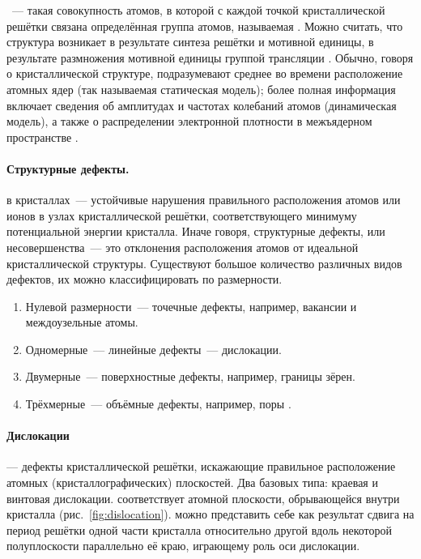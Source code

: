 \documentclass[a4paper, 14pt, titlepage]{extarticle}
\begin{document}
  ~--- такая совокупность атомов, в которой с каждой точкой
  кристаллической решётки связана определённая группа атомов, называемая . Можно считать,
  что структура возникает в результате синтеза решётки и мотивной единицы, в результате размножения
  мотивной единицы группой трансляции \cite{wiki-cryst-struct}.
  Обычно, говоря о кристаллической структуре, подразумевают среднее во времени расположение атомных
  ядер (так называемая статическая модель); более полная информация включает сведения об амплитудах и частотах
  колебаний атомов (динамическая модель), а также о распределении электронной плотности в межъядерном
  пространстве \cite{chemenc-crystall}.

  \paragraph{Структурные дефекты.}  в кристаллах~--- устойчивые нарушения правильного
  расположения атомов или ионов в узлах кристаллической решётки, соответствующего минимуму потенциальной
  энергии кристалла. Иначе говоря, структурные дефекты, или несовершенства~--- это отклонения
  расположения атомов от идеальной кристаллической структуры. Существуют большое количество
  различных видов дефектов, их можно классифицировать по размерности.
  \begin{enumerate}
    \item Нулевой размерности~--- точечные дефекты, например, вакансии и междоузельные атомы.
    \item Одномерные~--- линейные дефекты~--- дислокации.
    \item Двумерные~--- поверхностные дефекты, например, границы зёрен.
    \item Трёхмерные~--- объёмные дефекты, например, поры \cite{matare-defects}.
  \end{enumerate}

  \paragraph{Дислокации}--- дефекты кристаллической решётки, искажающие правильное расположение
  атомных (кристаллографических) плоскостей. Два базовых типа: краевая и винтовая дислокации.
   соответствует атомной плоскости, обрывающейся внутри кристалла (рис.~\ref{fig:dislocation}).
   можно представить себе как результат сдвига на период решётки одной
  части кристалла относительно другой вдоль некоторой полуплоскости параллельно её краю, играющему
  роль оси дислокации.
\end{document}
